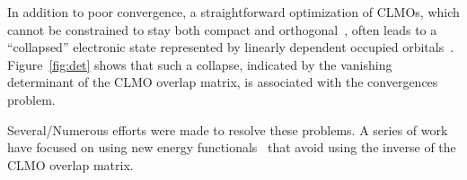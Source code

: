 \documentclass[aps,prl,twocolumn,reprint,amsmath,amssymb]{revtex4-1}
\begin{document}

In addition to poor convergence, a straightforward optimization of CLMOs, which cannot be constrained to stay both compact and orthogonal~\cite{stoll1980use, RZZK}, often leads to a ``collapsed'' electronic state represented by linearly dependent occupied orbitals~\cite{ordejon1995linear}. 
%
Figure~\ref{fig:det} shows that such a collapse, indicated by the vanishing determinant of the CLMO overlap matrix, is associated with 
the convergences problem. 

Several/Numerous efforts were made to resolve these problems. A series of work have focused on using new energy functionals~\cite{mauri1993orbital,kim1995total,ordejon1995linear} that avoid using the inverse of the CLMO overlap matrix. 
\end{document}
